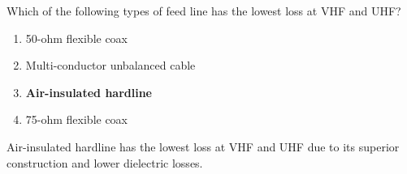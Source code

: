 \begin{tcolorbox}[colback=gray!10!white,colframe=black!75!black,title={T9B11}]
Which of the following types of feed line has the lowest loss at VHF and UHF?
\begin{enumerate}[label=\Alph*),noitemsep]
    \item 50-ohm flexible coax
    \item Multi-conductor unbalanced cable
    \item \textbf{Air-insulated hardline}
    \item 75-ohm flexible coax
\end{enumerate}
\end{tcolorbox}
Air-insulated hardline has the lowest loss at VHF and UHF due to its superior construction and lower dielectric losses.
